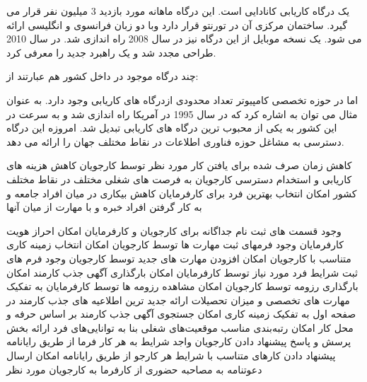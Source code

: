    یک درگاه کاریابی کانادایی است.  این درگاه ماهانه مورد بازدید 3 میلیون نفر قرار می گیرد. ساختمان مرکزی آن در تورنتو قرار دارد  وبا دو زبان فرانسوی و انگلیسی ارائه می شود. یک نسخه موبایل از این درگاه نیز در سال 2008 راه اندازی شد.   در سال 2010 طراحی مجدد شد و یک راهبرد جدید را معرفی کرد.

چند درگاه موجود در داخل کشور هم عبارتند از: 

اما در حوزه تخصصی کامپیوتر تعداد محدودی ازدرگاه های کاریابی وجود دارد. به عنوان مثال می توان به   اشاره کرد که در سال 1995 در آمریکا راه اندازی شد و به سرعت در این کشور به یکی از محبوب ترین درگاه های کاریابی تبدیل شد. امروزه این درگاه دسترسی به مشاغل حوزه فناوری اطلاعات در نقاط مختلف جهان را ارائه می دهد.

 کاهش زمان صرف شده برای یافتن کار مورد نظر توسط کارجویان
 کاهش هزینه های کاریابی و استخدام
 دسترسی کارجویان به فرصت های شغلی مختلف در نقاط مختلف کشور
 امکان انتخاب بهترین فرد برای کارفرمایان 
 کاهش بیکاری در میان افراد جامعه و به کار گرفتن افراد خبره و با مهارت از میان آنها

 وجود قسمت های ثبت نام جداگانه برای کارجویان و کارفرمایان
 امکان احراز هویت کارفرمایان 
 وجود فرمهای ثبت مهارت ها توسط کارجویان
 امکان انتخاب زمینه کاری متناسب با کارجویان
 امکان افزودن مهارت های جدید توسط کارجویان 
 وجود فرم های ثبت شرایط فرد مورد نیاز توسط کارفرمایان
 امکان بارگذاری آگهی جذب کارمند 
 امکان بارگذاری رزومه توسط کارجویان
 امکان مشاهده رزومه ها توسط کارفرمایان به تفکیک مهارت های تخصصی و میزان تحصیلات
 ارائه جدید ترین اطلاعیه های جذب کارمند در صفحه اول به تفکیک زمینه کاری
 امکان جستجوی آگهی جذب کارمند بر اساس حرفه و محل کار 
 امکان رتبه‌بندی مناسب موقعیت‌های شغلی بنا به توانایی‌های فرد
 ارائه بخش پرسش و پاسخ
 پیشنهاد دادن کارجویان واجد شرایط به هر کار فرما از طریق رایانامه  
 پیشنهاد دادن کارهای متناسب با شرایط هر کارجو  از طریق رایانامه
 امکان ارسال دعوتنامه به مصاحبه حضوری از کارفرما به کارجویان مورد نظر

